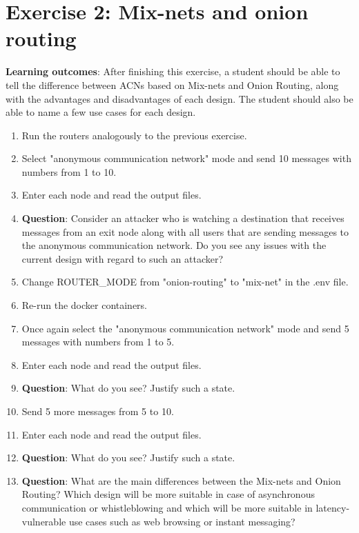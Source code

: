 \section*{Exercise 2: Mix-nets and onion routing}
\textbf{Learning outcomes}: After finishing this exercise, a student should be able to tell the difference between ACNs based on Mix-nets and Onion Routing, along with the advantages and disadvantages of each design. The student should also be able to name a few use cases for each design.
\begin{enumerate}
    \item Run the routers analogously to the previous exercise.
    \item Select "anonymous communication network" mode and send 10 messages with numbers from 1 to 10.
    \item Enter each node and read the output files.
    \item \textbf{Question}: Consider an attacker who is watching a destination that receives messages from an exit node along with all users that are sending messages to the anonymous communication network. Do you see any issues with the current design with regard to such an attacker?
    \item Change ROUTER\_MODE from "onion-routing" to "mix-net" in the .env file.
    \item Re-run the docker containers.
    \item Once again select the "anonymous communication network" mode and send 5 messages with numbers from 1 to 5.
    \item Enter each node and read the output files.
    \item \textbf{Question}: What do you see? Justify such a state.
    \item Send 5 more messages from 5 to 10.
    \item Enter each node and read the output files.
    \item \textbf{Question}: What do you see? Justify such a state.
    \item \textbf{Question}: What are the main differences between the Mix-nets and Onion Routing? Which design will be more suitable in case of asynchronous communication or whistleblowing and which will be more suitable in latency-vulnerable use cases such as web browsing or instant messaging?
\end{enumerate}

